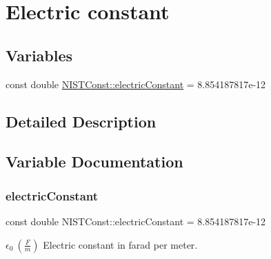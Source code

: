 \hypertarget{group___electric_constant}{}\section{Electric constant}
\label{group___electric_constant}
\subsection*{Variables}
\begin{DoxyCompactItemize}
\item 
const double \hyperlink{group___electric_constant_gae5a425228125285727dd53333725ef76}{N\+I\+S\+T\+Const\+::electric\+Constant} = 8.\+854187817e-\/12
\end{DoxyCompactItemize}


\subsection{Detailed Description}


\subsection{Variable Documentation}
\mbox{\label{group___electric_constant_gae5a425228125285727dd53333725ef76}} 
\subsubsection{\texorpdfstring{electric\+Constant}{electricConstant}}
{\footnotesize\ttfamily const double N\+I\+S\+T\+Const\+::electric\+Constant = 8.\+854187817e-\/12}

$\epsilon_0 \ (\frac{F}{m})$ Electric constant in farad per meter. 